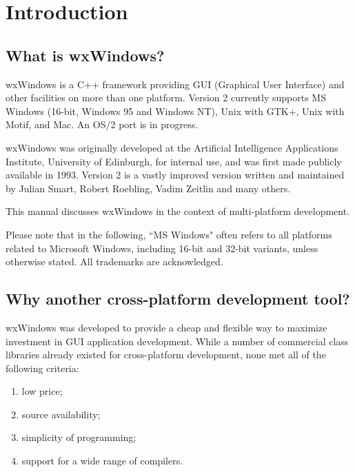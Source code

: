 \chapter{Introduction}\label{introduction}
%
%
\setfooter{\thepage}{}{}{}{}{\thepage}%

\section{What is wxWindows?}

wxWindows is a C++ framework providing GUI (Graphical User
Interface) and other facilities on more than one platform.  Version 2 currently
supports MS Windows (16-bit, Windows 95 and Windows NT), Unix with GTK+, Unix with Motif,
and Mac. An OS/2 port is in progress.

wxWindows was originally developed at the Artificial Intelligence
Applications Institute, University of Edinburgh, for internal use,
and was first made publicly available in 1993.
Version 2 is a vastly improved version written and maintained by
Julian Smart, Robert Roebling, Vadim Zeitlin and many others.

This manual discusses wxWindows in the context of multi-platform
development.

Please note that in the following, ``MS Windows" often refers to all
platforms related to Microsoft Windows, including 16-bit and 32-bit
variants, unless otherwise stated. All trademarks are acknowledged.

\section{Why another cross-platform development tool?}

wxWindows was developed to provide a cheap and flexible way to maximize
investment in GUI application development.  While a number of commercial
class libraries already existed for cross-platform development,
none met all of the following criteria:

\begin{enumerate}\itemsep=0pt
\item low price;
\item source availability;
\item simplicity of programming;
\item support for a wide range of compilers.
\end{enumerate}

